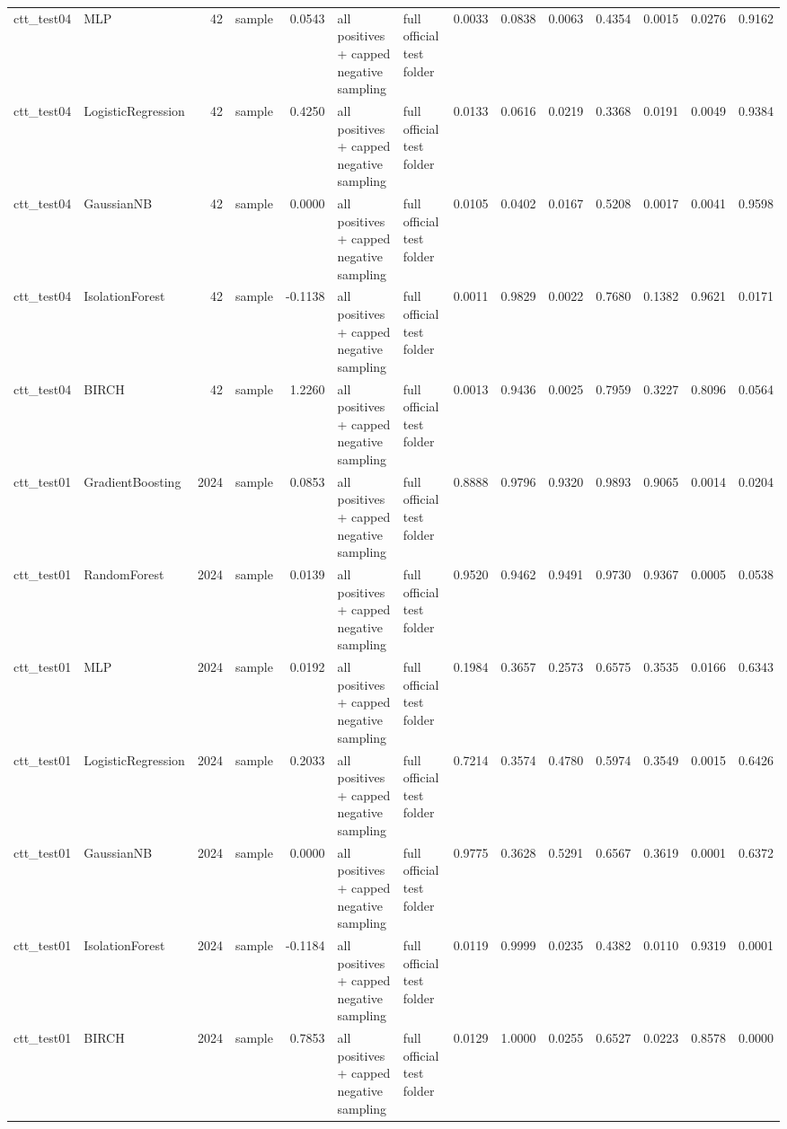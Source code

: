 \begin{tabular}{llrlrllrrrrrrr}
ctt\_test04 & MLP & 42 & sample & 0.0543 & all positives + capped negative sampling & full official test folder & 0.0033 & 0.0838 & 0.0063 & 0.4354 & 0.0015 & 0.0276 & 0.9162 \\
ctt\_test04 & LogisticRegression & 42 & sample & 0.4250 & all positives + capped negative sampling & full official test folder & 0.0133 & 0.0616 & 0.0219 & 0.3368 & 0.0191 & 0.0049 & 0.9384 \\
ctt\_test04 & GaussianNB & 42 & sample & 0.0000 & all positives + capped negative sampling & full official test folder & 0.0105 & 0.0402 & 0.0167 & 0.5208 & 0.0017 & 0.0041 & 0.9598 \\
ctt\_test04 & IsolationForest & 42 & sample & -0.1138 & all positives + capped negative sampling & full official test folder & 0.0011 & 0.9829 & 0.0022 & 0.7680 & 0.1382 & 0.9621 & 0.0171 \\
ctt\_test04 & BIRCH & 42 & sample & 1.2260 & all positives + capped negative sampling & full official test folder & 0.0013 & 0.9436 & 0.0025 & 0.7959 & 0.3227 & 0.8096 & 0.0564 \\
ctt\_test01 & GradientBoosting & 2024 & sample & 0.0853 & all positives + capped negative sampling & full official test folder & 0.8888 & 0.9796 & 0.9320 & 0.9893 & 0.9065 & 0.0014 & 0.0204 \\
ctt\_test01 & RandomForest & 2024 & sample & 0.0139 & all positives + capped negative sampling & full official test folder & 0.9520 & 0.9462 & 0.9491 & 0.9730 & 0.9367 & 0.0005 & 0.0538 \\
ctt\_test01 & MLP & 2024 & sample & 0.0192 & all positives + capped negative sampling & full official test folder & 0.1984 & 0.3657 & 0.2573 & 0.6575 & 0.3535 & 0.0166 & 0.6343 \\
ctt\_test01 & LogisticRegression & 2024 & sample & 0.2033 & all positives + capped negative sampling & full official test folder & 0.7214 & 0.3574 & 0.4780 & 0.5974 & 0.3549 & 0.0015 & 0.6426 \\
ctt\_test01 & GaussianNB & 2024 & sample & 0.0000 & all positives + capped negative sampling & full official test folder & 0.9775 & 0.3628 & 0.5291 & 0.6567 & 0.3619 & 0.0001 & 0.6372 \\
ctt\_test01 & IsolationForest & 2024 & sample & -0.1184 & all positives + capped negative sampling & full official test folder & 0.0119 & 0.9999 & 0.0235 & 0.4382 & 0.0110 & 0.9319 & 0.0001 \\
ctt\_test01 & BIRCH & 2024 & sample & 0.7853 & all positives + capped negative sampling & full official test folder & 0.0129 & 1.0000 & 0.0255 & 0.6527 & 0.0223 & 0.8578 & 0.0000 \\

\end{tabular}
